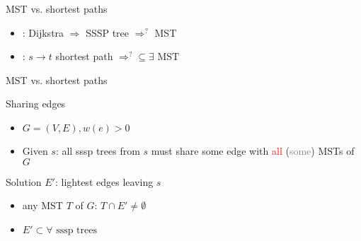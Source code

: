 \begin{frame}{MST vs. shortest paths}
  \begin{exampleblock}{}
     \begin{itemize}
       \item {}: Dijkstra $\Rightarrow$ SSSP tree $\Rightarrow^{?}$ MST
       \item {}: $s \to t$ shortest path $\Rightarrow^{?} \subseteq \exists \text{ MST}$
     \end{itemize}
  \end{exampleblock}
\end{frame}
\begin{frame}{MST vs. shortest paths}
  \begin{exampleblock}{Sharing edges }
    \begin{itemize}
      \item $G = (V, E), w(e) > 0$
      \item Given $s$: all sssp trees from $s$ must share some edge with \textcolor{red}{all} (\textcolor{gray}{some}) MSTs of $G$
    \end{itemize}
  \end{exampleblock}

  \begin{block}{Solution}
    $E'$: lightest edges leaving $s$
    \begin{itemize}
      \item any MST $T$ of $G$: $T \cap E' \neq \emptyset$
      \item $E' \subset \forall \text{ sssp trees}$
    \end{itemize}
  \end{block}
\end{frame}
